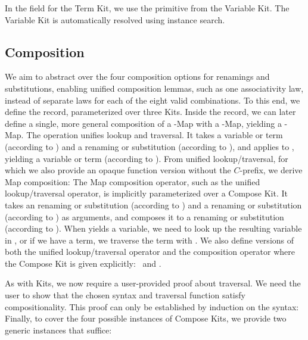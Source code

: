 \documentclass[screen,nonacm]{acmart}
\begin{document}
\noindent\begin{minipage}[t]{0.48\linewidth}
      \raggedright{}
      \AInstanceRen{}
\end{minipage}
\begin{minipage}[t]{0.48\linewidth}
      \raggedright{}
      \AInstanceSub{}
\end{minipage}

\noindent In the  field for the Term Kit, we use the  primitive from the
Variable Kit. The Variable Kit is automatically resolved using
instance search.

\subsection{Composition}\label{sec:ags-com}
We aim to abstract over the four composition options for renamings and
substitutions, enabling unified composition lemmas, such as one associativity
law, instead of separate laws for each of the eight valid combinations. To this
end, we define the  record, parameterized over three
Kits. Inside the record, we can later define a single, more general composition
of a -Map with a -Map, yielding a
-Map. \AComposeKit{}The operation 
unifies lookup and traversal. It takes a variable or term 
(according to ) and a renaming or substitution 
(according to ), and applies  to ,
yielding a variable or term (according to ). From unified
lookup/traversal, for which we also provide an opaque function version without
the $C$-prefix, we derive Map composition: \ACompDef{}The Map composition
operator, such as the unified lookup/traversal operator, is implicitly
parameterized over a Compose Kit. It takes an renaming or substitution
 (according to ) and a renaming or substitution
 (according to ) as arguments, and composes it to a
renaming or substitution (according to ). When 
\AgdaFunction{\&}  yields a variable, we need to look up the
resulting variable in , or if we have a term, we traverse the
term with . We also define versions of both the unified
lookup/traversal operator and the composition operator where the Compose Kit is
given explicitly: \ACompExp\ and \ALoAExp.

As with Kits, we now require a user-provided proof about traversal. We need the
user to show that the chosen syntax and traversal function satisfy
compositionality. This proof can only be established by induction on the
syntax: \ACompositionality{}Finally, to cover the four possible instances of
Compose Kits, we provide two generic instances that suffice:
\end{document}

